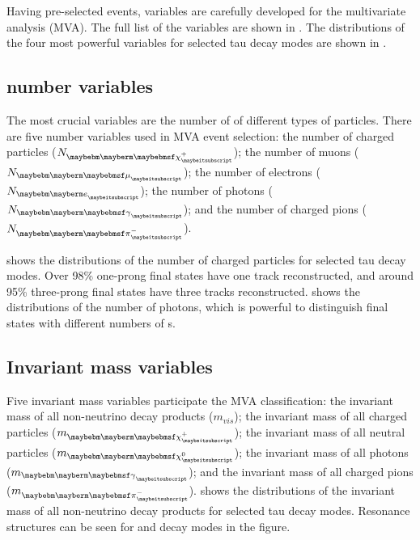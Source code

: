Having pre-selected events,  variables are carefully developed for the multivariate analysis (MVA). The full list of the variables are shown in . The distributions of the four most powerful variables for selected tau decay modes are shown in .

\subsection{\PFOs number variables}

The most crucial variables are the number of \PFOs of different types of particles. There are five \PFOs number variables used in MVA event selection: the number of charged particles (${N}_{\charge}$); the number of muons (${N}_{\Pmu}$); the number of electrons (${N}_{\Pe}$); the number of photons (${N}_{\Pgg}$); and the number of charged pions (${N}_{\Pgpm}$).

 shows the distributions of the number of charged particles for selected tau decay modes. Over 98\% one-prong final states have one track reconstructed, and around 95\%  three-prong final states have three tracks reconstructed.  shows the distributions of the number of photons, which is powerful to distinguish final states with different numbers of \Ppizero s.


\subsection{Invariant mass variables}

Five invariant mass variables participate the MVA classification: the invariant mass of all non-neutrino decay products ($m_{vis}$); the invariant mass of all charged particles ($m_{\charge}$); the invariant mass of all neutral particles ($m_{\neutral}$); the invariant mass of all photons ($m_{\Pgg}$); and the invariant mass of all charged pions ($m_{\Pgpm}$).  shows the distributions of the invariant mass of all non-neutrino decay products for selected tau decay modes. Resonance structures can be seen for \Prho and \Pai decay modes in the figure.

